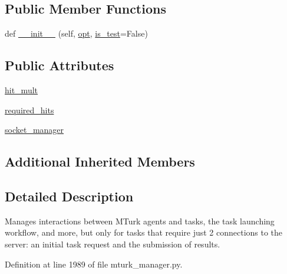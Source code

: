 \subsection*{Public Member Functions}
\begin{DoxyCompactItemize}
\item 
def \hyperlink{classparlai_1_1mturk_1_1core_1_1mturk__manager_1_1StaticMTurkManager_ab5bd9c520d5aefcb52031fb8c0d2f4bc}{\+\_\+\+\_\+init\+\_\+\+\_\+} (self, \hyperlink{classparlai_1_1mturk_1_1core_1_1mturk__manager_1_1MTurkManager_a1167cb8359db58221b2843554731cf1b}{opt}, \hyperlink{classparlai_1_1mturk_1_1core_1_1mturk__manager_1_1MTurkManager_aba2c8855ba4baadd54a42a834aaf75bd}{is\+\_\+test}=False)
\end{DoxyCompactItemize}
\subsection*{Public Attributes}
\begin{DoxyCompactItemize}
\item 
\hyperlink{classparlai_1_1mturk_1_1core_1_1mturk__manager_1_1StaticMTurkManager_ae5ea8ccfb26e3ea55357bf4f34edef27}{hit\+\_\+mult}
\item 
\hyperlink{classparlai_1_1mturk_1_1core_1_1mturk__manager_1_1StaticMTurkManager_aa41b3c50a7fe1b11a022b8d6877b5e65}{required\+\_\+hits}
\item 
\hyperlink{classparlai_1_1mturk_1_1core_1_1mturk__manager_1_1StaticMTurkManager_ad705fb400223ca7f2e9c9b2026a04d07}{socket\+\_\+manager}
\end{DoxyCompactItemize}
\subsection*{Additional Inherited Members}


\subsection{Detailed Description}
\begin{DoxyVerb}Manages interactions between MTurk agents and tasks, the task launching workflow,
and more, but only for tasks that require just 2 connections to the server: an
initial task request and the submission of results.
\end{DoxyVerb}
 

Definition at line 1989 of file mturk\+\_\+manager.\+py.



